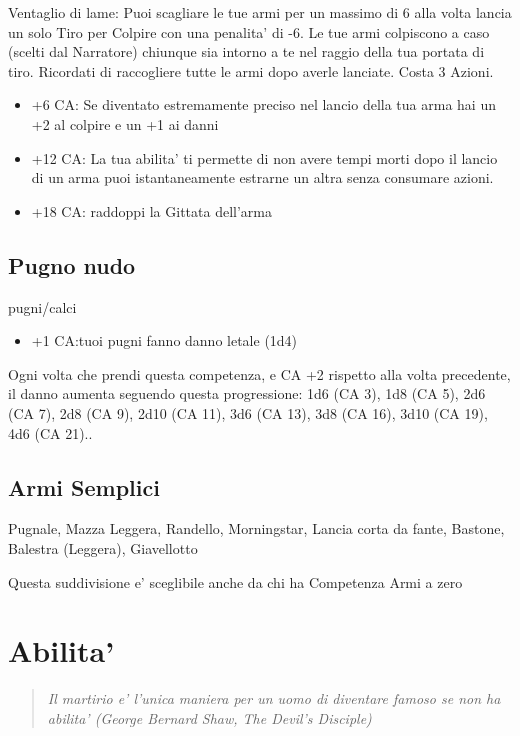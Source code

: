 \documentclass[a4paper,11pt,twoside,openany]{book}
\begin{document}
Ventaglio di lame: Puoi scagliare le tue armi per un massimo di 6 alla volta lancia un solo Tiro per Colpire con una penalita' di -6. Le tue armi colpiscono a caso (scelti dal Narratore) chiunque sia intorno a te nel raggio della tua portata di tiro. Ricordati di raccogliere tutte le armi dopo averle lanciate. Costa 3 Azioni.

\begin{itemize}
\item +6 CA: Se diventato estremamente preciso nel lancio della tua arma hai un +2 al colpire e un +1 ai danni

\item +12 CA: La tua abilita' ti permette di non avere tempi morti dopo il lancio di un arma puoi istantaneamente estrarne un altra senza consumare azioni.

\item +18 CA: raddoppi la Gittata dell'arma
\end{itemize}

\subsection{Pugno nudo} pugni/calci

\begin{itemize}
	\item +1 CA:tuoi pugni fanno danno letale (1d4)
\end{itemize}

Ogni volta che prendi questa competenza, e CA +2 rispetto alla volta precedente, il danno aumenta seguendo questa progressione: 1d6 (CA 3), 1d8 (CA 5), 2d6 (CA 7), 2d8 (CA 9), 2d10 (CA 11), 3d6 (CA 13), 3d8 (CA 16), 3d10 (CA 19), 4d6 (CA 21)..

\subsection{Armi Semplici} Pugnale, Mazza Leggera, Randello, Morningstar, Lancia corta da fante, Bastone, Balestra (Leggera), Giavellotto

Questa suddivisione e' sceglibile anche da chi ha Competenza Armi a zero 

\pagebreak

\section{Abilita'}

\label{abilita}
\begin{quote}\textit{
Il martirio e' l'unica maniera per un uomo di diventare famoso se non ha abilita' (George Bernard Shaw, The Devil's Disciple)
}\end{quote}
\end{document}
